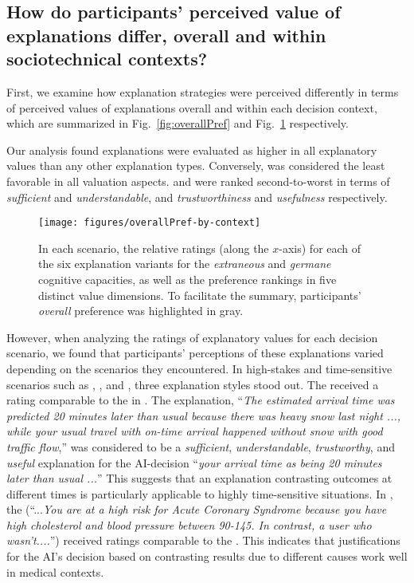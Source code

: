 \subsection{How do participants' perceived value of explanations differ, overall and within sociotechnical contexts?}\label{sec:values}

First, we examine how explanation strategies were perceived differently in terms of perceived values of explanations overall and within each decision context, which are summarized in Fig.~\ref{fig:overallPref} and Fig.~\ref{fig:overallPref-context} respectively.

Our analysis found \comp explanations were evaluated as higher in all explanatory values than any other explanation types. Conversely, \cbhe was considered the least favorable in all valuation aspects. \cf and \cbho were ranked second-to-worst in terms of {\it sufficient} and {\it understandable}, and {\it trustworthiness} and {\it usefulness} respectively.

\begin{figure}[H]%
\centering
\texttt{[image: figures/overallPref-by-context]}
\vspace{-2em}
\caption{In each scenario, the relative ratings (along the $x$-axis) for each of the six explanation variants for the {\it extraneous} and {\it germane} cognitive capacities, as well as the preference rankings in five distinct value dimensions. To facilitate the summary, participants' {\it overall} preference was highlighted in gray.}\label{fig:overallPref-context}
\end{figure}

However, when analyzing the ratings of explanatory values for each decision scenario, we found that participants’ perceptions of these explanations varied depending on the scenarios they encountered. In high-stakes and time-sensitive scenarios such as \drivN, \loanN, and \mediN, three explanation styles stood out. The \ctt received a rating comparable to the \comp in \drivN. The \ctt explanation, ``\textit{The estimated arrival time was predicted 20 minutes later than usual because there was heavy snow last night ..., while your usual travel with on-time arrival happened without snow with good traffic flow},'' was considered to be a {\it sufficient}, {\it understandable}, {\it trustworthy}, and {\it useful} explanation for the AI-decision ``{\it your arrival time as being 20 minutes later than usual ...}'' This suggests that an explanation contrasting outcomes at different times is particularly applicable to highly time-sensitive situations. In \mediN, the \cto (``...\textit{You are at a high risk for Acute Coronary Syndrome because you have high cholesterol and blood pressure between 90-145. In contrast, a user who wasn't....}'') received ratings comparable to the \comp. This indicates that justifications for the AI's decision based on contrasting results due to different causes work well in medical contexts.

